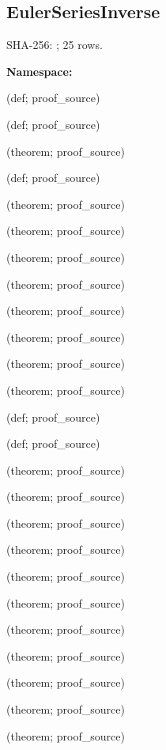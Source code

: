 \subsection*{EulerSeriesInverse}
{\footnotesize SHA-256: ; 25 rows.}\par
\begingroup\small
\textbf{Namespace:} \par
\noindent{} {\scriptsize (def; proof\_source)}\par
\noindent{} {\scriptsize (def; proof\_source)}\par
\noindent{} {\scriptsize (theorem; proof\_source)}\par
\noindent{} {\scriptsize (def; proof\_source)}\par
\noindent{} {\scriptsize (theorem; proof\_source)}\par
\noindent{} {\scriptsize (theorem; proof\_source)}\par
\noindent{} {\scriptsize (theorem; proof\_source)}\par
\noindent{} {\scriptsize (theorem; proof\_source)}\par
\noindent{} {\scriptsize (theorem; proof\_source)}\par
\noindent{} {\scriptsize (theorem; proof\_source)}\par
\noindent{} {\scriptsize (theorem; proof\_source)}\par
\noindent{} {\scriptsize (theorem; proof\_source)}\par
\noindent{} {\scriptsize (def; proof\_source)}\par
\noindent{} {\scriptsize (def; proof\_source)}\par
\noindent{} {\scriptsize (theorem; proof\_source)}\par
\noindent{} {\scriptsize (theorem; proof\_source)}\par
\noindent{} {\scriptsize (theorem; proof\_source)}\par
\noindent{} {\scriptsize (theorem; proof\_source)}\par
\noindent{} {\scriptsize (theorem; proof\_source)}\par
\noindent{} {\scriptsize (theorem; proof\_source)}\par
\noindent{} {\scriptsize (theorem; proof\_source)}\par
\noindent{} {\scriptsize (theorem; proof\_source)}\par
\noindent{} {\scriptsize (theorem; proof\_source)}\par
\noindent{} {\scriptsize (theorem; proof\_source)}\par
\noindent{} {\scriptsize (theorem; proof\_source)}\par
\endgroup
